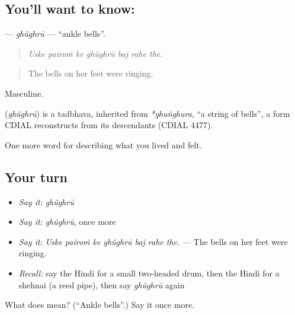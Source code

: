 \subsection*{You'll want to know: }
\textbf{} — \emph{ghũghrū} — \textquotedblleft{}ankle bells\textquotedblright{}.

\begin{quote}
      
\end{quote}

\begin{quote}
\emph{Uske pairoṁ ke ghũghrū baj rahe the.}
\end{quote}

\begin{quote}
The bells on her feet were ringing.
\end{quote}

Masculine.

\begin{cousinweb}
\textbf{} (\emph{ghũghrū}) is a tadbhava, inherited from \emph{*ghuṅghura}, \textquotedblleft{}a string of bells\textquotedblright{}, a form CDIAL reconstructs from its descendants (CDIAL 4477).
\end{cousinweb}

\begin{grammarlens}[title={What you've built}]
One more word for describing what you lived and felt.
\end{grammarlens}

\subsection*{Your turn}
\begin{itemize}
\raggedright
  \item \emph{Say it:} \emph{ghũghrū}
  \item \emph{Say it:} \emph{ghũghrū}, once more
  \item \emph{Say it:} \emph{Uske pairoṁ ke ghũghrū baj rahe the.} — The bells on her feet were ringing.
  \item \emph{Recall:} say the Hindi for a small two-headed drum, then the Hindi for a shehnai (a reed pipe), then say \emph{ghũghrū} again
\end{itemize}

\begin{tcolorbox}[breakable,colback=teal!4,colframe=teal!35!black,title={Before you move on}]
What does  mean? (\textquotedblleft{}Ankle bells\textquotedblright{}.) Say it once more.
\end{tcolorbox}
